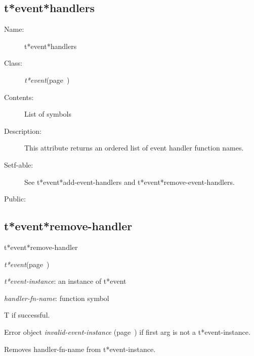 \subsection{t*event*handlers}
\label{t*event*handlers}

\begin{description}
\item [Name:]  t*event*handlers

\item [Class:] {\sl t*event}\hfill(page~\pageref{t*event})

\item [Contents:] List of symbols

\item [Description:]

This attribute returns an ordered list of event
handler function names. 

\item [Setf-able:] See t*event*add-event-handlers and 
t*event*remove-event-handlers.


\item [Public:]



\end{description}
\horizontalline

\subsection{t*event*remove-handler}
\label{t*event*remove-handler}

\begin{description}
\item [Name:]  t*event*remove-handler

\item [Class:] {\sl t*event}\hfill(page~\pageref{t*event})

\item [Parameters:]
\item {\sl t*event-instance}:  an instance of t*event


\item {\sl handler-fn-name}:  function symbol


\item [Return-value:]
T if successful.

Error object {\sl invalid-event-instance} (page~\pageref{invalid-event-instance}) if first
arg is not a t*event-instance.

\item [Description:]

Removes handler-fn-name from t*event-instance.

\item [Public:]



\end{description}
\horizontalline

